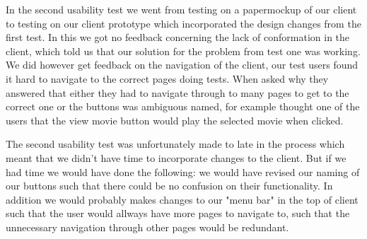 In the second usability test we went from testing on a papermockup of our client to testing on our client prototype which incorporated the design changes from the first test. In this we got no feedback concerning the lack of conformation in the client, which told us that our solution for the problem from test one was working. We did however get feedback on the navigation of the client, our test users found it hard to navigate to the correct pages doing tests. When asked why they answered that either they had to navigate through to many pages to get to the correct one or the buttons was ambiguous named, for example thought one of the users that the view movie button would play the selected movie when clicked.

The second usability test was unfortunately made to late in the process which meant that we didn't have time to incorporate changes to the client. But if we had time we would have done the following: we would have revised our naming of our buttons such that there could be no confusion on their functionality. In addition we would probably makes changes to our "menu bar" in the top of client such that the user would allways have more pages to navigate to, such that the unnecessary navigation through other pages would be redundant.

